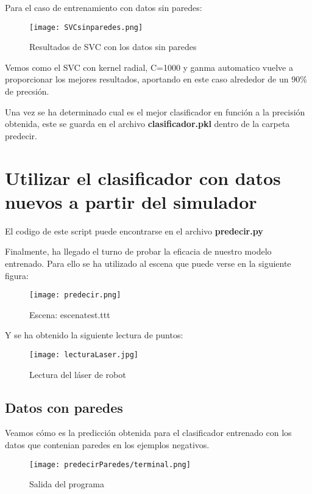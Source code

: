 Para el caso de entrenamiento con datos sin paredes:

\begin{figure}[H]
	\centering
	\texttt{[image: SVCsinparedes.png]}
	\caption{Resultados de SVC con los datos sin paredes}
\end{figure}

Vemos como el SVC con kernel radial, C=1000 y ganma automatico vuelve a proporcionar los mejores resultados, aportando en este caso alrededor de un 90\% de precsión.

Una vez se ha determinado cual es el mejor clasificador en función a la precisión obtenida, este se guarda en el archivo \textbf{clasificador.pkl} dentro de la carpeta predecir.

\newpage

\section{Utilizar el clasificador con datos nuevos a partir del simulador}

El codigo de este script puede encontrarse en el archivo \textbf{predecir.py}

Finalmente, ha llegado el turno de probar la eficacia de nuestro modelo entrenado. Para ello se ha utilizado al escena que puede verse en la siguiente figura:
\begin{figure}[H]
	\centering
	\texttt{[image: predecir.png]}
	\caption{Escena: escenatest.ttt}
\end{figure}

Y se ha obtenido la siguiente lectura de puntos:

\begin{figure}[H]
	\centering
	\texttt{[image: lecturaLaser.jpg]}
	\caption{Lectura del láser de robot}
\end{figure}

\subsection{Datos con paredes}
Veamos cómo es la predicción obtenida para el clasificador entrenado con los datos que contenian paredes en los ejemplos negativos.

\begin{figure}[H]
	\centering
	\texttt{[image: predecirParedes/terminal.png]}
	\caption{Salida del programa}
\end{figure}

